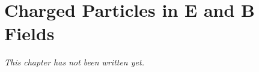 \chapter{Charged Particles in E and B Fields}\label{ch:b1:charged-particles}


\emph{This chapter has not been written yet.}
